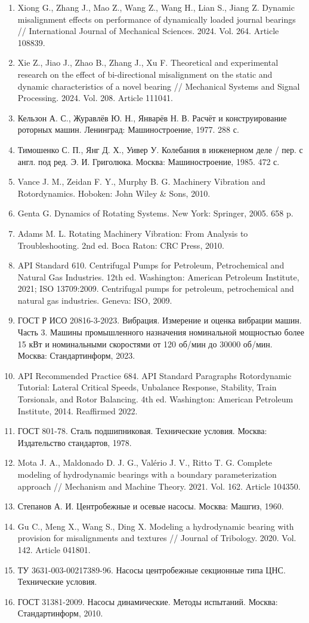 \begin{enumerate}
    \item Xiong G., Zhang J., Mao Z., Wang Z., Wang H., Lian S., Jiang Z. Dynamic misalignment effects on performance of dynamically loaded journal bearings // International Journal of Mechanical Sciences. 2024. Vol. 264. Article 108839.
    \item Xie Z., Jiao J., Zhao B., Zhang J., Xu F. Theoretical and experimental research on the effect of bi-directional misalignment on the static and dynamic characteristics of a novel bearing // Mechanical Systems and Signal Processing. 2024. Vol. 208. Article 111041.
    \item Кельзон А. С., Журавлёв Ю. Н., Январёв Н. В. Расчёт и конструирование роторных машин. Ленинград: Машиностроение, 1977. 288 с.
    \item Тимошенко С. П., Янг Д. Х., Уивер У. Колебания в инженерном деле / пер. с англ. под ред. Э. И. Григолюка. Москва: Машиностроение, 1985. 472 с.
    \item Vance J. M., Zeidan F. Y., Murphy B. G. Machinery Vibration and Rotordynamics. Hoboken: John Wiley \& Sons, 2010.
    \item Genta G. Dynamics of Rotating Systems. New York: Springer, 2005. 658 p.
    \item Adams M. L. Rotating Machinery Vibration: From Analysis to Troubleshooting. 2nd ed. Boca Raton: CRC Press, 2010.
    \item API Standard 610. Centrifugal Pumps for Petroleum, Petrochemical and Natural Gas Industries. 12th ed. Washington: American Petroleum Institute, 2021; ISO 13709:2009. Centrifugal pumps for petroleum, petrochemical and natural gas industries. Geneva: ISO, 2009.
    \item ГОСТ Р ИСО 20816-3-2023. Вибрация. Измерение и оценка вибрации машин. Часть 3. Машины промышленного назначения номинальной мощностью более 15 кВт и номинальными скоростями от 120 об/мин до 30000 об/мин. Москва: Стандартинформ, 2023.
    \item API Recommended Practice 684. API Standard Paragraphs Rotordynamic Tutorial: Lateral Critical Speeds, Unbalance Response, Stability, Train Torsionals, and Rotor Balancing. 4th ed. Washington: American Petroleum Institute, 2014. Reaffirmed 2022.
    \item ГОСТ 801-78. Сталь подшипниковая. Технические условия. Москва: Издательство стандартов, 1978.
    \item Mota J. A., Maldonado D. J. G., Valério J. V., Ritto T. G. Complete modeling of hydrodynamic bearings with a boundary parameterization approach // Mechanism and Machine Theory. 2021. Vol. 162. Article 104350.
    \item Степанов А. И. Центробежные и осевые насосы. Москва: Машгиз, 1960.
    \item Gu C., Meng X., Wang S., Ding X. Modeling a hydrodynamic bearing with provision for misalignments and textures // Journal of Tribology. 2020. Vol. 142. Article 041801.
    \item ТУ 3631-003-00217389-96. Насосы центробежные секционные типа ЦНС. Технические условия.
    \item ГОСТ 31381-2009. Насосы динамические. Методы испытаний. Москва: Стандартинформ, 2010.
\end{enumerate}
